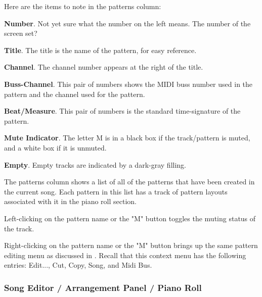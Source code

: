    Here are the items to note in the patterns column:

   \begin{enumber}
      \item \textbf{Number}.
         Not yet sure what the number on the left means.
         The number of the screen set?
      \item \textbf{Title}.
         The title is the name of the pattern, for easy reference.
      \item \textbf{Channel}.
         The channel number appears at the right of the title.
      \item \textbf{Buss-Channel}.
         This pair of numbers shows the MIDI buss number used in the pattern and
         the channel used for the pattern.
      \item \textbf{Beat/Measure}.
         This pair of numbers is the standard time-signature of the pattern.
      \item \textbf{Mute Indicator}.
         The letter M is in a black box if the track/pattern is muted, and a
         white box if it is unmuted.
      \item \textbf{Empty}.
         Empty tracks are indicated by a dark-gray filling.
   \end{enumber}

   The patterns column shows a list of all of the patterns that have been
   created in the current song.  Each pattern in this list has a track of
   pattern layouts associated with it in the piano roll section.

   Left-clicking on the pattern name or the "M" button toggles the muting
   status of the track.

   Right-clicking on the pattern name or the "M" button brings up the same
   pattern editing menu as discussed in
   .
   Recall that this context menu has the following entries:
   Edit..., Cut, Copy, Song, and Midi Bus.

\subsubsection{Song Editor / Arrangement Panel / Piano Roll}
\label{subsubsec:seq24_song_editor_arrangement_panel_roll}

